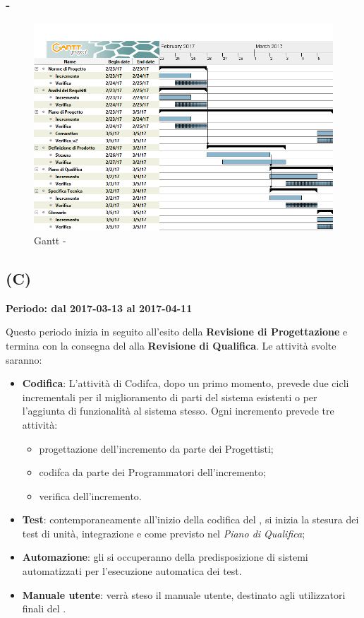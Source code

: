 \documentclass[./PianoDiProgetto.tex]{subfiles}
\begin{document}
  \subsubsection{ - \PerPD}
    \begin{figure}[!h]
    \centering
    \includegraphics[width=\textwidth]{images/PD}
    \caption{Gantt - \PerPD}
    \end{figure}


  \subsection{\PerC{} (C)}
  \textbf{Periodo: dal 2017-03-13 al 2017-04-11}

  Questo periodo inizia in seguito all'esito della \textbf{Revisione di Progettazione} e termina con la consegna del  alla \textbf{Revisione di Qualifica}. Le attività svolte saranno:
  \begin{itemize}
    \item \textbf{Codifica}:
    L'attività di Codifca, dopo un primo momento, prevede due cicli incrementali per il miglioramento
    di parti del sistema esistenti o per l'aggiunta di funzionalità al sistema stesso.
    Ogni incremento prevede tre attività:
    \begin{itemize}
    	\item progettazione dell'incremento da parte dei Progettisti;
    	\item codifca da parte dei Programmatori dell'incremento;
    	\item verifica dell'incremento.
    \end{itemize}
    
    \item \textbf{Test}: contemporaneamente all'inizio della codifica del , si inizia la stesura dei test di unità, integrazione e  come previsto nel \textit{Piano di Qualifica};
    \item \textbf{Automazione}: gli \AMMP{} si occuperanno della predisposizione di sistemi automatizzati per l'esecuzione automatica dei test.
    \item \textbf{Manuale utente}: verrà steso il manuale utente, destinato agli utilizzatori finali del .
  \end{itemize}
\end{document}
